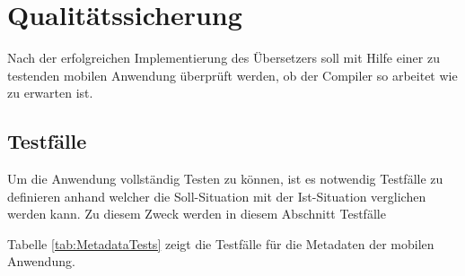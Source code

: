 \chapter{Qualitätssicherung}
\label{chap:Qualitätssicherung}

Nach der erfolgreichen Implementierung des Übersetzers soll mit Hilfe einer zu testenden mobilen Anwendung überprüft werden,  ob der Compiler so arbeitet wie zu erwarten ist.  
\section{Testfälle}
Um die Anwendung vollständig Testen zu können, ist es notwendig Testfälle zu definieren anhand welcher die Soll-Situation mit der Ist-Situation verglichen werden kann.  Zu diesem Zweck werden in diesem Abschnitt Testfälle 

Tabelle \ref{tab:MetadataTests} zeigt die Testfälle für die Metadaten der mobilen Anwendung. 


